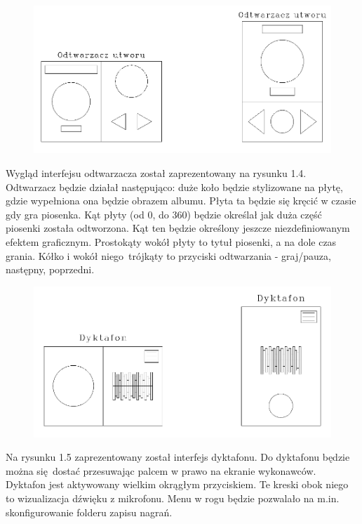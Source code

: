 \begin{figure}[H]
	\centering
	\includegraphics[width=1\linewidth]{images/mockup2_odtwarzacz}
	\caption{}
	\label{fig:mockup2odtwarzacz}
\end{figure}


Wygląd interfejsu odtwarzacza został zaprezentowany na rysunku 1.4. Odtwarzacz będzie działał następująco: duże koło będzie stylizowane na płytę, gdzie wypełniona ona będzie obrazem albumu. Płyta ta będzie się kręcić w czasie gdy gra piosenka. Kąt płyty (od 0\degree, do 360\degree) będzie określał jak duża część piosenki została odtworzona. Kąt ten będzie określony jeszcze niezdefiniowanym efektem graficznym. Prostokąty wokół płyty to tytuł piosenki, a na dole czas grania. Kółko i wokół niego trójkąty to przyciski odtwarzania - graj/pauza, następny, poprzedni.

\begin{figure}[H]
	\centering
	\includegraphics[width=1\linewidth]{images/mockup2_dyktafon}
	\caption{}
	\label{fig:mockup2dyktafon}
\end{figure}


Na rysunku 1.5 zaprezentowany został interfejs dyktafonu.
Do dyktafonu będzie można się dostać przesuwając palcem w prawo na ekranie wykonawców. Dyktafon jest aktywowany wielkim okrągłym przyciskiem. Te kreski obok niego to wizualizacja dźwięku z mikrofonu. Menu w rogu będzie pozwalało na m.in. skonfigurowanie folderu zapisu nagrań.
